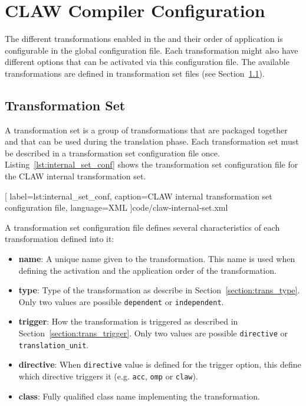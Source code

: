 \chapter{CLAW Compiler Configuration}
\label{chapter:configuration}

The different transformations enabled in the \clawfcomp and their order of
application is configurable in the \clawfcomp global configuration file. Each
transformation might also have different options that can be activated via this
configuration file. The available transformations are defined in transformation
set files (see Section~\ref{section:conf_trans_set}).

\section{Transformation Set}
\label{section:conf_trans_set}
A transformation set is a group of transformations that are packaged together 
and that can be used during the translation phase. Each transformation set must 
be described in a transformation set configuration file once.
Listing~\ref{lst:internal_set_conf} shows the transformation set
configuration file for the CLAW internal transformation set.


  [
    label=lst:internal_set_conf,
    caption=CLAW internal transformation set configuration file,
    language=XML
  ]{code/claw-internal-set.xml}

A transformation set configuration file defines several characteristics of each
transformation defined into it:
\begin{itemize}
  \item \textbf{name}: A unique name given to the transformation. This name is
        used when defining the activation and the application order of the
        transformation.
  \item \textbf{type}: Type of the transformation as describe in
        Section~\ref{section:trans_type}. Only two values are possible
        \lstinline|dependent| or \lstinline|independent|.
  \item \textbf{trigger}: How the transformation is triggered as described in
        Section~\ref{section:trans_trigger}. Only two values are possible
        \lstinline|directive| or \lstinline|translation_unit|.
  \item \textbf{directive}: When \lstinline|directive| value is defined for the
        trigger option, this define which directive triggers it (e.g.
        \lstinline|acc|, \lstinline|omp| or \lstinline|claw|).
  \item \textbf{class}: Fully qualified class name implementing the
        transformation.
\end{itemize}


